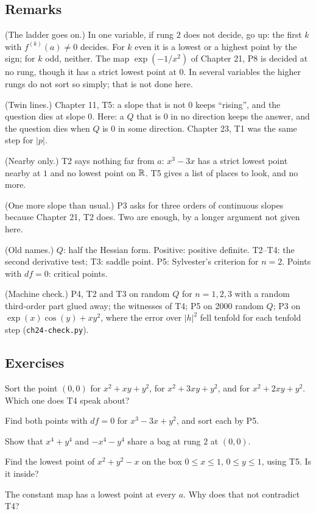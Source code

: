\subsection*{Remarks}

\begin{lines}
\item[\lab{R1}] (The ladder goes on.) In one variable, if rung $2$ does not decide, go up: the first $k$ with $f^{(k)}(a) \neq 0$ decides. For $k$ even it is a lowest or a highest point by the sign; for $k$ odd, neither. The map $\exp(-1/x^2)$ of Chapter 21, P8 is decided at no rung, though it has a strict lowest point at $0$. In several variables the higher rungs do not sort so simply; that is not done here.
\item[\lab{R2}] (Twin lines.) Chapter 11, T5: a slope that is not $0$ keeps ``rising'', and the question dies at slope $0$. Here: a $Q$ that is $0$ in no direction keeps the answer, and the question dies when $Q$ is $0$ in some direction. Chapter 23, T1 was the same step for $|p|$.
\item[\lab{R3}] (Nearby only.) T2 says nothing far from $a$: $x^3 - 3x$ has a strict lowest point nearby at $1$ and no lowest point on $\mathbb{R}$. T5 gives a list of places to look, and no more.
\item[\lab{R4}] (One more slope than usual.) P3 asks for three orders of continuous slopes because Chapter 21, T2 does. Two are enough, by a longer argument not given here.
\item[\lab{R5}] (Old names.) $Q$: half the Hessian form. Positive: positive definite. T2--T4: the second derivative test; T3: saddle point. P5: Sylvester's criterion for $n = 2$. Points with $df = 0$: critical points.
\item[\lab{R6}] (Machine check.) P4, T2 and T3 on random $Q$ for $n = 1, 2, 3$ with a random third-order part glued away; the witnesses of T4; P5 on 2000 random $Q$; P3 on $\exp(x)\cos(y) + x y^2$, where the error over $|h|^2$ fell tenfold for each tenfold step (\texttt{ch24-check.py}).
\end{lines}

\subsection*{Exercises}

\begin{lines}
\item[\lab{E1}] Sort the point $(0, 0)$ for $x^2 + xy + y^2$, for $x^2 + 3xy + y^2$, and for $x^2 + 2xy + y^2$. Which one does T4 speak about?
\item[\lab{E2}] Find both points with $df = 0$ for $x^3 - 3x + y^2$, and sort each by P5.
\item[\lab{E3}] Show that $x^4 + y^4$ and $-x^4 - y^4$ share a bag at rung $2$ at $(0, 0)$.
\item[\lab{E4}] Find the lowest point of $x^2 + y^2 - x$ on the box $0 \le x \le 1$, $0 \le y \le 1$, using T5. Is it inside?
\item[\lab{E5}] The constant map has a lowest point at every $a$. Why does that not contradict T4?
\end{lines}

